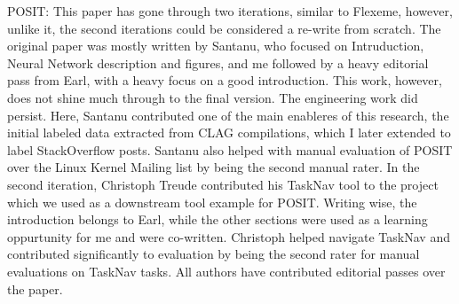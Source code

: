 \begin{acknowledgements}
POSIT: This paper has gone through two iterations, similar to Flexeme, however,
unlike it, the second iterations could be considered a re-write from scratch.
The original paper was mostly written by Santanu, who focused on Intruduction,
Neural Network description and figures, and me followed by a heavy editorial
pass from Earl, with a heavy focus on a good introduction. This work, however,
does not shine much through to the final version. The engineering work did
persist. Here, Santanu contributed one of the main enableres of this research,
the initial labeled data extracted from CLAG compilations, which I later
extended to label StackOverflow posts. Santanu also helped with manual
evaluation of POSIT over the Linux Kernel Mailing list by being the second
manual rater. In the second iteration, Christoph Treude contributed his TaskNav
tool to the project which we used as a downstream tool example for POSIT.
Writing wise, the introduction belongs to Earl, while the other sections were
used as a learning oppurtunity for me and were co-written. Christoph helped
navigate TaskNav and contributed significantly to evaluation by being the second
rater for manual evaluations on TaskNav tasks. All authors have contributed
editorial passes over the paper.


\end{acknowledgements}

\setcounter{tocdepth}{2} 

\tableofcontents
\listoffigures
\listoftables


